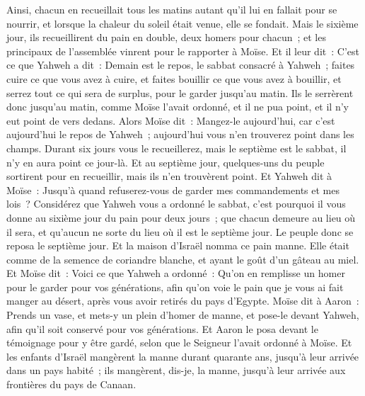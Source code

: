 \begin{multicols}{2}
Ainsi, chacun en recueillait tous les matins autant qu'il lui en fallait pour se nourrir, et lorsque la chaleur du soleil était venue, elle se fondait.
Mais le sixième jour, ils recueillirent du pain en double, deux homers pour chacun~; et les principaux de l'assemblée vinrent pour le rapporter à Moïse.
 Et il leur dit~: C'est ce que Yahweh a dit~: Demain est le repos, le sabbat consacré à Yahweh~; faites cuire ce que vous avez à cuire, et faites bouillir ce que vous avez à bouillir, et serrez tout ce qui sera de surplus, pour le garder jusqu'au matin.
Ils le serrèrent donc jusqu'au matin, comme Moïse l'avait ordonné, et il ne pua point, et il n'y eut point de vers dedans.
Alors Moïse dit~: Mangez-le aujourd'hui, car c'est aujourd'hui le repos de Yahweh~; aujourd'hui vous n'en trouverez point dans les champs.
Durant six jours vous le recueillerez, mais le septième est le sabbat, il n'y en aura point ce jour-là.
Et au septième jour, quelques-uns du peuple sortirent pour en recueillir, mais ils n'en trouvèrent point.
Et Yahweh dit à Moïse~: Jusqu'à quand refuserez-vous de garder mes commandements et mes lois~?
Considérez que Yahweh vous a ordonné le sabbat, c'est pourquoi il vous donne au sixième jour du pain pour deux jours~; que chacun demeure au lieu où il sera, et qu'aucun ne sorte du lieu où il est le septième jour.
Le peuple donc se reposa le septième jour.
Et la maison d'Israël nomma ce pain manne. Elle était comme de la semence de coriandre blanche, et ayant le goût d'un gâteau au miel.
Et Moïse dit~: Voici ce que Yahweh a ordonné~: Qu'on en remplisse un homer pour le garder pour vos générations, afin qu'on voie le pain que je vous ai fait manger au désert, après vous avoir retirés du pays d'Egypte.
Moïse dit à Aaron~: Prends un vase, et mets-y un plein d'homer de manne, et pose-le devant Yahweh, afin qu'il soit conservé pour vos générations.
Et Aaron le posa devant le témoignage pour y être gardé, selon que le Seigneur l'avait ordonné à Moïse.
Et les enfants d'Israël mangèrent la manne durant quarante ans, jusqu'à leur arrivée dans un pays habité~; ils mangèrent, dis-je, la manne, jusqu'à leur arrivée aux frontières du pays de Canaan.

\end{multicols}
